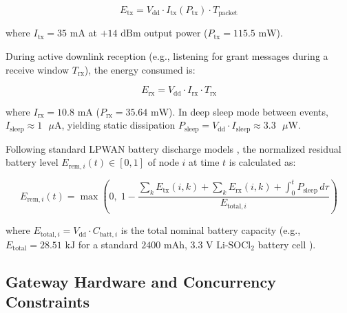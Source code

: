 \documentclass[preprint,review,12pt]{elsarticle}
\begin{document}
\begin{equation}

\label{eq:etx}

E_{\text{tx}} = V_{\text{dd}} \cdot I_{\text{tx}}(P_{\text{tx}}) \cdot T_{\text{packet}}

\end{equation}

where $I_{\text{tx}} = 35\text{ mA}$ at $+14\text{ dBm}$ output power ($P_{\text{tx}} = 115.5\text{ mW}$).

During active downlink reception (e.g., listening for grant messages during a receive window $T_{\text{rx}}$), the energy consumed is:

\begin{equation}

\label{eq:erx}

E_{\text{rx}} = V_{\text{dd}} \cdot I_{\text{rx}} \cdot T_{\text{rx}}

\end{equation}

where $I_{\text{rx}} = 10.8\text{ mA}$ ($P_{\text{rx}} = 35.64\text{ mW}$). In deep sleep mode between events, $I_{\text{sleep}} \approx 1\text{ }\mu\text{A}$, yielding static dissipation $P_{\text{sleep}} = V_{\text{dd}} \cdot I_{\text{sleep}} \approx 3.3\text{ }\mu\text{W}$. 

Following standard LPWAN battery discharge models \cite{bouguera2018energy, casals2017modeling}, the normalized residual battery level $E_{\text{rem}, i}(t) \in [0, 1]$ of node $i$ at time $t$ is calculated as:

\begin{equation}

\label{eq:erem}

E_{\text{rem}, i}(t) = \max\left(0, \; 1 - \frac{\sum_{k} E_{\text{tx}}(i,k) + \sum_{k} E_{\text{rx}}(i,k) + \int_0^t P_{\text{sleep}} \, d\tau}{E_{\text{total}, i}}\right)

\end{equation}

where $E_{\text{total}, i} = V_{\text{dd}} \cdot C_{\text{batt}, i}$ is the total nominal battery capacity (e.g., $E_{\text{total}} = 28.51\text{ kJ}$ for a standard $2400\text{ mAh}$, $3.3\text{ V}$ $\text{Li-SOCl}_2$ battery cell \cite{bouguera2018energy}).

\subsection{Gateway Hardware and Concurrency Constraints}
\end{document}
